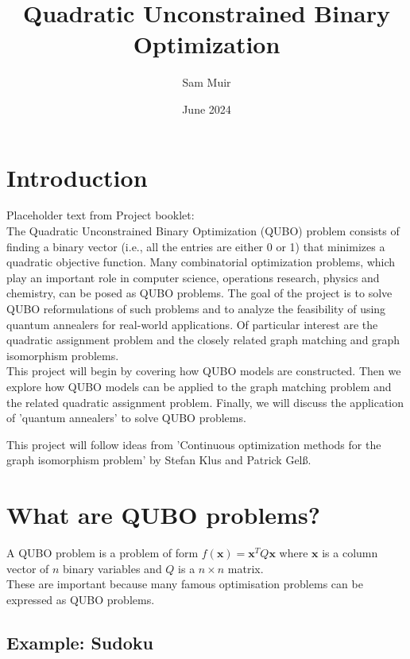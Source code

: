 \documentclass{article}
\title{Quadratic Unconstrained Binary Optimization}
\author{Sam Muir }
\date{June 2024}
\begin{document}
\maketitle

\section{Introduction}

Placeholder text from Project booklet: \\
\colorbox{BurntOrange}{The Quadratic Unconstrained Binary Optimization (QUBO) problem consists of finding a binary}
\colorbox{BurntOrange}{vector (i.e., all the entries are either 0 or 1) that minimizes a quadratic objective function. Many}
\colorbox{BurntOrange}{combinatorial optimization problems, which play an important role in computer science, operations}
\colorbox{BurntOrange}{research, physics and chemistry, can be posed as QUBO problems. The goal of the project is to solve}
\colorbox{BurntOrange}{QUBO reformulations of such problems and to analyze the feasibility of using quantum annealers for}
\colorbox{BurntOrange}{real-world applications. Of particular interest are the quadratic assignment problem and the closely}
\colorbox{BurntOrange}{related graph matching and graph isomorphism problems.}\\

This project will begin by covering how QUBO models are constructed. Then we explore how QUBO models can be applied to the graph matching problem and the related quadratic assignment problem. Finally, we will discuss the application of 'quantum annealers' to solve QUBO problems. 

This project will follow ideas from 'Continuous optimization methods for the graph isomorphism problem' by Stefan Klus and Patrick Gelß.

\section{What are QUBO problems?}
A QUBO problem is a problem of form \(f(\mathbf{x}) = \mathbf{x}^T Q \mathbf{x}\) where \(\mathbf{x}\) is a column vector of \(n\) binary variables and \(Q\) is a \(n \times n \) matrix.\\

These are important because many famous optimisation problems can be expressed as QUBO problems. 

\subsection{Example: Sudoku}
\newpage
\end{document}
